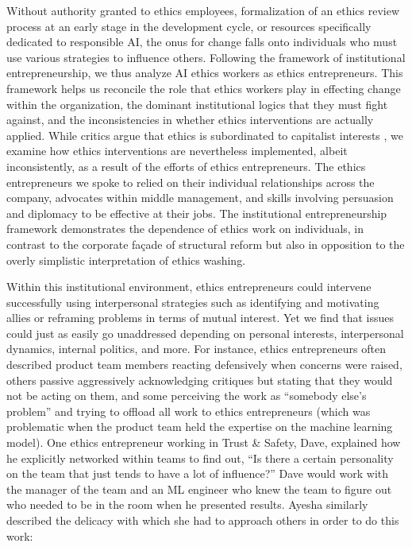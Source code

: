 \documentclass[sigconf]{acmart}
\begin{document}
Without authority granted to ethics employees, formalization of an ethics review process at an early stage in the development cycle, or resources specifically dedicated to responsible AI, the onus for change falls onto individuals who must use various strategies to influence others. Following the framework of institutional entrepreneurship, we thus analyze AI ethics workers as ethics entrepreneurs. This framework helps us reconcile the role that ethics workers play in effecting change within the organization, the dominant institutional logics that they must fight against, and the inconsistencies in whether ethics interventions are actually applied. While critics argue that ethics is subordinated to capitalist interests \cite{metcalf_owning_2019, phan_economies_2021}, we examine how ethics interventions are nevertheless implemented, albeit inconsistently, as a result of the efforts of ethics entrepreneurs. The ethics entrepreneurs we spoke to relied on their individual relationships across the company, advocates within middle management, and skills involving persuasion and diplomacy to be effective at their jobs. The institutional entrepreneurship framework demonstrates the dependence of ethics work on individuals, in contrast to the corporate façade of structural reform but also in opposition to the overly simplistic interpretation of ethics washing. 

Within this institutional environment, ethics entrepreneurs could intervene successfully using interpersonal strategies such as identifying and motivating allies or reframing problems in terms of mutual interest. Yet we find that issues could just as easily go unaddressed depending on personal interests, interpersonal dynamics, internal politics, and more. For instance, ethics entrepreneurs often described product team members reacting defensively when concerns were raised, others passive aggressively acknowledging critiques but stating that they would not be acting on them, and some perceiving the work as “somebody else’s problem” and trying to offload all work to ethics entrepreneurs (which was problematic when the product team held the expertise on the machine learning model). One ethics entrepreneur working in Trust \& Safety, Dave, explained how he explicitly networked within teams to find out, “Is there a certain personality on the team that just tends to have a lot of influence?” Dave would work with the manager of the team and an ML engineer who knew the team to figure out who needed to be in the room when he presented results. Ayesha similarly described the delicacy with which she had to approach others in order to do this work:
\end{document}

